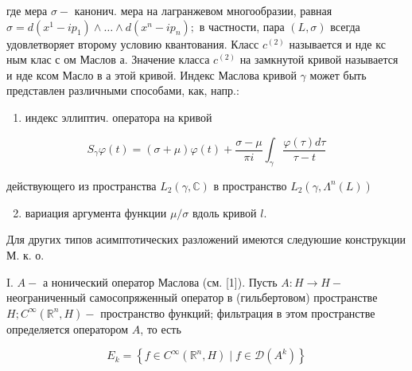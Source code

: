 \documentclass[10pt]{article}
\begin{document}
где мера $\sigma-$ канонич. мера на лагранжевом многообразии, равная $\sigma=d\left(x^{1}-i p_{1}\right) \wedge \ldots \wedge d\left(x^{n}-i p_{n}\right) ;$ в частности, пара $(L, \sigma)$ всегда удовлетворяет второму условию квантования. Класс $c^{(2)}$ называется и нде кс ным клас с ом Маслов а. Значение класса $c^{(2)}$ на замкнутой кривой называется и нде ксом Масло в а этой кривой. Индекс Маслова кривой $\gamma$ может быть представлен различными способами, как, напр.:



\begin{enumerate}

  \item индекс эллиптич. оператора на кривой

\end{enumerate}



\[

S_{\gamma} \varphi(t)=(\sigma+\mu) \varphi(t)+\frac{\sigma-\mu}{\pi i} \int_{\gamma} \frac{\varphi(\tau) d \tau}{\tau-t}

\]



действующего из пространства $L_{2}(\gamma, \mathbb{C})$ в пространство $L_{2}\left(\gamma, \Lambda^{n}(L)\right)$



\begin{enumerate}

  \setcounter{enumi}{1}

  \item вариация аргумента функции $\mu / \sigma$ вдоль кривой $l$.

\end{enumerate}



Для других типов асимптотических разложений имеются следуюшие конструкции М. к. о.



I. $A-$ а нонический оператор Маслова (см. [1]). Пусть $A: H \rightarrow H-$ неограниченный самосопряженный оператор в (гильбертовом) пространстве $H ; C^{\infty}\left(\mathbb{R}^{n}, H\right)-$ пространство функций; фильтрация в этом пространстве определяется оператором $A$, то есть



\[

E_{k}=\left\{f \in C^{\infty}\left(\mathbb{R}^{n}, H\right) \mid f \in \mathscr{D}\left(A^{k}\right)\right\}

\]
\end{document}
